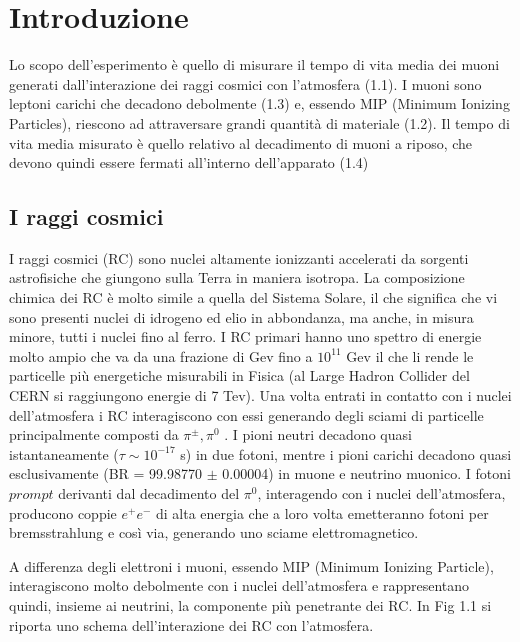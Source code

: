 \documentclass{standalone}
\begin{document}
	\pagestyle{fancy}
	\lhead{\rightmark}
	\rhead{\thepage}

\chapter{Introduzione}
Lo scopo dell'esperimento è quello di misurare il tempo di vita media dei muoni generati dall'interazione dei raggi cosmici con l'atmosfera (1.1). I muoni sono leptoni carichi che decadono debolmente (1.3) e, essendo MIP (Minimum Ionizing Particles), riescono ad attraversare grandi quantità di materiale (1.2). Il tempo di vita media misurato è quello relativo al decadimento di muoni a riposo, che devono quindi essere fermati all'interno dell'apparato (1.4)

\section{I raggi cosmici}
I raggi cosmici (RC) sono nuclei altamente ionizzanti accelerati da sorgenti astrofisiche che giungono sulla Terra in maniera isotropa. La composizione chimica dei RC è molto simile a quella del Sistema Solare, il che significa che vi sono presenti nuclei di idrogeno ed elio in abbondanza, ma anche, in misura minore,  tutti i nuclei fino al ferro.
I RC primari hanno uno spettro di energie molto ampio che va da una frazione di Gev fino a $10^{11}$ Gev il che li rende le particelle più energetiche misurabili in Fisica (al Large Hadron Collider del CERN si raggiungono energie di 7 Tev).
Una volta entrati in contatto con i nuclei dell'atmosfera i RC interagiscono con essi generando degli sciami di particelle principalmente composti da $\pi^\pm, \pi^0$ \cite{Spurio}.
I pioni neutri decadono quasi istantaneamente ($\tau \sim 10^{-17}$ s) in due fotoni, mentre i pioni carichi decadono quasi esclusivamente (BR = 99.98770 $\pm$ 0.00004) in muone e neutrino muonico.
I fotoni $prompt$ derivanti dal decadimento del $\pi^0$, interagendo con i nuclei dell'atmosfera, producono coppie $e^+e^-$ di alta energia che a loro volta emetteranno fotoni per bremsstrahlung e così via, generando uno sciame elettromagnetico.

A differenza degli elettroni i muoni, essendo MIP (Minimum Ionizing Particle), interagiscono molto debolmente con i nuclei dell'atmosfera e rappresentano quindi, insieme ai neutrini, la componente più penetrante dei RC. In Fig 1.1 si riporta uno schema dell'interazione dei RC con l'atmosfera. 
\end{document}
